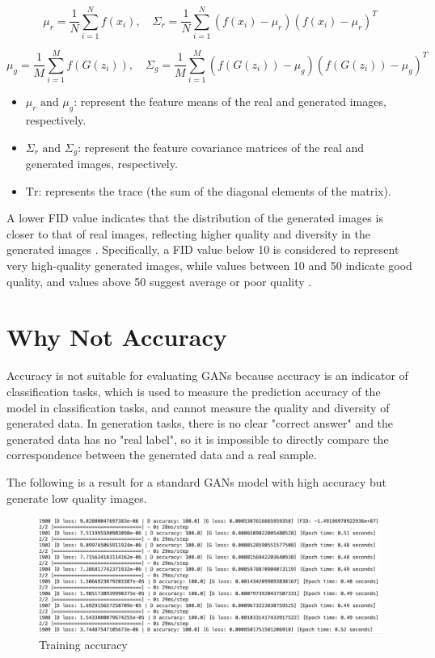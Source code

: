 \begin{equation}
    \mu_r = \frac{1}{N} \sum_{i=1}^{N} f(x_i), \quad \Sigma_r = \frac{1}{N} \sum_{i=1}^{N} (f(x_i) - \mu_r)(f(x_i) - \mu_r)^T
\end{equation}

\begin{equation}
    \mu_g = \frac{1}{M} \sum_{i=1}^{M} f(G(z_i)), \quad \Sigma_g = \frac{1}{M} \sum_{i=1}^{M} (f(G(z_i)) - \mu_g)(f(G(z_i)) - \mu_g)^T
\end{equation}


\begin{itemize}
    \item $\mu_r \text{ and } \mu_g$: represent the feature means of the real and generated images, respectively.
    \item $\Sigma_r \text{ and } \Sigma_g$: represent the feature covariance matrices of the real and generated images, respectively.
    \item $\text{Tr}$: represents the trace (the sum of the diagonal elements of the matrix).
\end{itemize}


A lower FID value indicates that the distribution of the generated images is closer to that of real images, 
reflecting higher quality and diversity in the generated images \citep{10.1117/12.2673366}. 
Specifically, a FID value below 10 is considered to represent very high-quality generated images, 
while values between 10 and 50 indicate good quality, and values above 50 suggest average or poor quality \citep{10.1117/12.2673366}.



\section{Why Not Accuracy}
Accuracy is not suitable for evaluating GANs because accuracy is an indicator of classification tasks, 
which is used to measure the prediction accuracy of the model in classification tasks, and cannot 
measure the quality and diversity of generated data. In generation tasks, there is no clear 
"correct answer" and the generated data has no "real label", so it is impossible to directly 
compare the correspondence between the generated data and a real sample. 

The following is a result for a standard GANs model with high accuracy but generate low quality images.


\begin{figure}[H]
    \centering
    \includegraphics[width=1.2\linewidth]{./Images/model_accuracy.jpg}
    \caption{Training accuracy}
    \label{fig:my_picture}
\end{figure}

